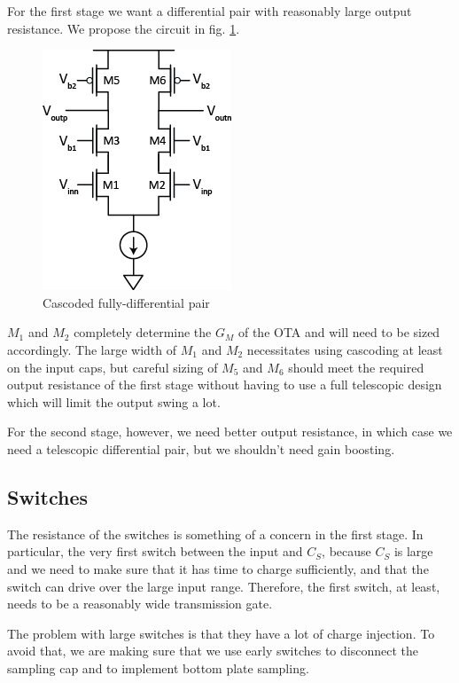 \documentclass[conference]{IEEEtran}
\begin{document}
For the first stage we want a differential pair with reasonably large output resistance. We propose the circuit in fig. \ref{cascoded-diffpair}.

\begin{figure}[h]
\centering
\includegraphics[width=0.4\linewidth]{illustrator/cascoded-diffpair}
\caption{Cascoded fully-differential pair}
\label{cascoded-diffpair}
\end{figure}

$M_1$ and $M_2$ completely determine the $G_M$ of the OTA and will need to be sized accordingly. The large width of $M_1$ and $M_2$ necessitates using cascoding at least on the input caps, but careful sizing of $M_5$ and $M_6$ should meet the required output resistance of the first stage without having to use a full telescopic design which will limit the output swing a lot.

For the second stage, however, we need better output resistance, in which case we need a telescopic differential pair, but we shouldn't need gain boosting.

\subsection{Switches}
The resistance of the switches is something of a concern in the first stage. In particular, the very first switch between the input and $C_S$, because $C_S$ is large and we need to make sure that it has time to charge sufficiently, and that the switch can drive over the large input range. Therefore, the first switch, at least, needs to be a reasonably wide transmission gate.

The problem with large switches is that they have a lot of charge injection. To avoid that, we are making sure that we use early switches to disconnect the sampling cap and to implement bottom plate sampling.
\end{document}
